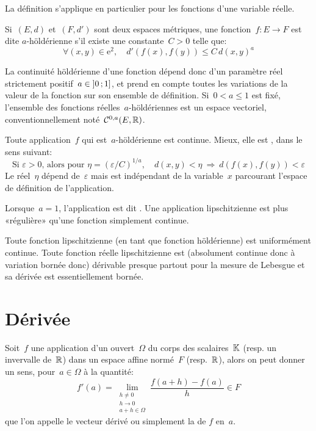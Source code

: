 La définition s'applique en particulier pour les fonctions d'une variable réelle.

\medskip
\begin{definition}
Si~$(E, d)$ et~$(F, d')$ sont deux espaces métriques, une fonction~$f: E \rightarrow F$ est dite
$a$-höldérienne s'il existe une constante~$C > 0$ telle que:
\begin{equation}
  \forall (x, y) \in \mathrm{e}^2,\quad d'\left(f(x), f(y)\right) \le C\,d\left(x,y\right)^a
\end{equation}
\end{definition}
\medskip
La continuité höldérienne d'une fonction dépend donc d'un paramètre réel
strictement positif~$a \in \mathopen{]}0\,;1\mathclose{]}$, et prend en compte toutes les variations de la valeur de
la fonction sur son ensemble de définition.
\medskip
Si~$0 < a \leq1$ est fixé, l'ensemble des fonctions réelles~$a$-höldériennes est un
espace vectoriel, conventionnellement noté~$\mathcal{C}^{0, a}(E,\mathbb R)$.

\medskip
\begin{theoreme}
Toute application~$f$ qui est~$a$-höldérienne est continue. Mieux, elle est
, dans le sens suivant:
\begin{equation}
\text{Si } \varepsilon>0\text{, alors pour } \eta = \left( \varepsilon / C \right)^{1 / a},\quad d\left( x, y \right) < \eta \ \Rightarrow\ d\left( f(x), f(y) \right) < \varepsilon
\end{equation}
Le réel~$\eta$ dépend de~$\varepsilon$ mais est indépendant de la variable~$x$
parcourant l'espace de définition de l'application.
\end{theoreme}
\begin{definition}
Lorsque~$a = 1$, l'application est dit .
Une application lipschitzienne est plus «régulière» qu'une fonction
simplement continue.
\end{definition}
\medskip
Toute fonction lipschitzienne (en tant que fonction höldérienne) est uniformément continue.
\medskip
Toute fonction réelle lipschitzienne est (absolument continue donc à variation bornée donc)
dérivable presque partout pour la mesure de Lebesgue et sa dérivée est essentiellement bornée.
\medskip
\section{Dérivée}
\medskip
\begin{definition}
Soit~$f$ une application d'un ouvert~$\Omega$ du corps des scalaires~$\mathbb K$ (resp. un invervalle
de~$\mathbb R$) dans un espace affine normé~$F$ (resp.~$\mathbb R$), alors on peut donner un sens,
pour~$a\in\Omega$ à la quantité:
\begin{equation}
f'(a)=\lim_{\substack{h\ne0\\h\to0\\a+h\in\Omega}} \dfrac{f(a+h)-f(a)}h \in F
\end{equation}
que l'on appelle le vecteur dérivé ou simplement la  de
$f$ en~$a$.
\end{definition}

